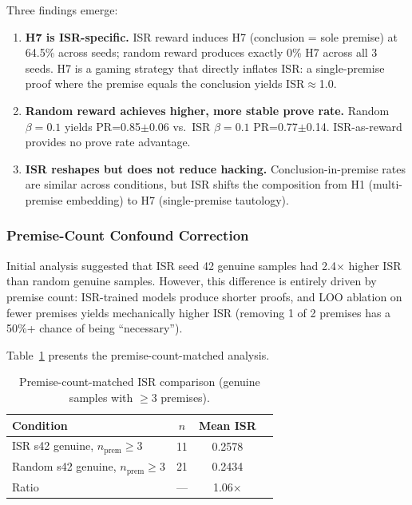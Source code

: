 \documentclass[11pt,a4paper]{article}
\newcommand{\isr}{\textsc{ISR}}
\newcommand{\pr}{\textsc{PR}}
\begin{document}
Three findings emerge:
\begin{enumerate}[nosep]
\item \textbf{H7 is ISR-specific.} ISR reward induces H7 (conclusion = sole premise) at 64.5\% across seeds; random reward produces exactly 0\% H7 across all 3 seeds. H7 is a gaming strategy that directly inflates \isr{}: a single-premise proof where the premise equals the conclusion yields \isr{}${\approx}$1.0.
\item \textbf{Random reward achieves higher, more stable prove rate.} Random $\beta{=}0.1$ yields \pr{}=0.85$\pm$0.06 vs.\ ISR $\beta{=}0.1$ \pr{}=0.77$\pm$0.14. ISR-as-reward provides no prove rate advantage.
\item \textbf{ISR reshapes but does not reduce hacking.} Conclusion-in-premise rates are similar across conditions, but ISR shifts the composition from H1 (multi-premise embedding) to H7 (single-premise tautology).
\end{enumerate}

\subsubsection{Premise-Count Confound Correction}
\label{sec:premise_count}

Initial analysis suggested that ISR seed 42 genuine samples had 2.4$\times$ higher \isr{} than random genuine samples.
However, this difference is entirely driven by premise count: ISR-trained models produce shorter proofs, and LOO ablation on fewer premises yields mechanically higher \isr{} (removing 1 of 2 premises has a 50\%+ chance of being ``necessary'').

Table~\ref{tab:premise_matched} presents the premise-count-matched analysis.

\begin{table}[h]
\centering
\caption{Premise-count-matched ISR comparison (genuine samples with $\geq$3 premises).}
\label{tab:premise_matched}
\begin{tabular}{lccc}
\toprule
Condition & $n$ & Mean ISR \\
\midrule
ISR s42 genuine, $n_{\text{prem}} \geq 3$ & 11 & 0.2578 \\
Random s42 genuine, $n_{\text{prem}} \geq 3$ & 21 & 0.2434 \\
\midrule
Ratio & --- & 1.06$\times$ \\
\bottomrule
\end{tabular}
\end{table}
\end{document}
